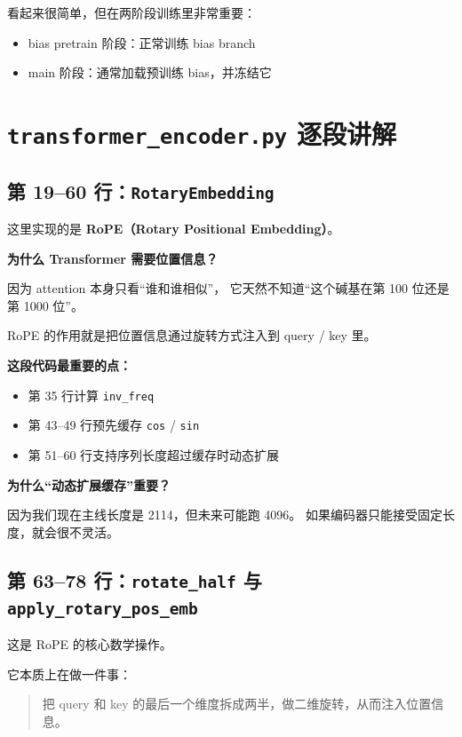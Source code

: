 \documentclass[11pt,a4paper]{ctexart}
\begin{document}
看起来很简单，但在两阶段训练里非常重要：

\begin{itemize}[leftmargin=2em]
\item bias pretrain 阶段：正常训练 bias branch
\item main 阶段：通常加载预训练 bias，并冻结它
\end{itemize}

\section{\texttt{transformer\_encoder.py} 逐段讲解}

\subsection{第 19--60 行：\texttt{RotaryEmbedding}}

这里实现的是 \textbf{RoPE（Rotary Positional Embedding）}。

\textbf{为什么 Transformer 需要位置信息？}

因为 attention 本身只看“谁和谁相似”，
它天然不知道“这个碱基在第 100 位还是第 1000 位”。

RoPE 的作用就是把位置信息通过旋转方式注入到 query / key 里。

\textbf{这段代码最重要的点：}

\begin{itemize}[leftmargin=2em]
\item 第 35 行计算 \texttt{inv\_freq}
\item 第 43--49 行预先缓存 \texttt{cos} / \texttt{sin}
\item 第 51--60 行支持序列长度超过缓存时动态扩展
\end{itemize}

\textbf{为什么“动态扩展缓存”重要？}

因为我们现在主线长度是 2114，但未来可能跑 4096。
如果编码器只能接受固定长度，就会很不灵活。

\subsection{第 63--78 行：\texttt{rotate\_half} 与 \texttt{apply\_rotary\_pos\_emb}}

这是 RoPE 的核心数学操作。

它本质上在做一件事：

\begin{quote}
把 query 和 key 的最后一个维度拆成两半，做二维旋转，从而注入位置信息。
\end{quote}
\end{document}
